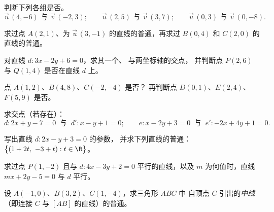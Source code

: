\begin{exercise}[$\star$]\label{exo:g11:vect:2}
判断下列各组是否。
\[
\vec u\,(4, -6) \text{ 与 } \vec v\,(-2, 3); \qquad
\vec u\,(2, 5) \text{ 与 } \vec v\,(3, 7); \qquad
\vec u\,(0, 3) \text{ 与 } \vec v\,(0, -8).
\]
\end{exercise}

\begin{exercise}[$\star$]\label{exo:g11:vect:3}
求过点 $A(2, 1)$、为
$\vec u\,(3, -1)$ 的直线的普通，再求过 $B(0, 4)$ 和
$C(2, 0)$ 的直线的普通。
\end{exercise}

\begin{exercise}[$\star$]\label{exo:g11:vect:4}
对直线 $d: 3x - 2y + 6 = 0$，求其一个、
与两坐标轴的交点，
并判断点 $P(2, 6)$ 与 $Q(1, 4)$ 是否在直线 $d$ 上。
\end{exercise}

\begin{exercise}[$\star\star$]\label{exo:g11:vect:5}
点 $A(1, 2)$、$B(4, 8)$、$C(-2, -4)$ 是否？
再判断点 $D(0, 1)$、$E(2, 4)$、$F(5, 9)$ 是否。
\end{exercise}

\begin{exercise}[$\star\star$]\label{exo:g11:vect:6}
求交点（若存在）：
\[
d: 2x + y - 7 = 0 \ \text{ 与 }\ d': x - y + 1 = 0;
\qquad
e: x - 2y + 3 = 0 \ \text{ 与 }\ e': -2x + 4y + 1 = 0 .
\]
\end{exercise}

\begin{exercise}[$\star\star$]\label{exo:g11:vect:7}
写出直线 $d: 2x - y + 3 = 0$ 的参数，
并求下列直线的普通：
$\bigl\{(1 + 2t,\ -3 + t) : t \in \R\bigr\}$。
\end{exercise}

\begin{exercise}[$\star\star$]\label{exo:g11:vect:8}
求过点 $P(1, -2)$ 且与
$d: 4x - 3y + 2 = 0$ 平行的直线，以及 $m$ 为何值时，直线
$mx + 2y - 5 = 0$ 与 $d$ 平行。
\end{exercise}

\begin{exercise}[$\star\star$]\label{exo:g11:vect:9}
设 $A(-1, 0)$、$B(3, 2)$、$C(1, -4)$，求三角形 $ABC$ 中
自顶点 $C$ 引出的\emph{中线}（即连接 $C$
与 $[AB]$ 的直线）的普通。
\end{exercise}

